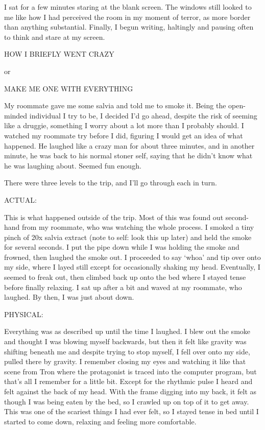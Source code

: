I sat for a few minutes staring at the blank screen.  The windows still looked to me like how I had perceived the room in my moment of terror, as more border than anything substantial.  Finally, I begun writing, haltingly and pausing often to think and stare at my screen.

\vspace{1em}\begin{sloppypar}{\ttfamily
HOW I BRIEFLY WENT CRAZY 

or 

MAKE ME ONE WITH EVERYTHING

My roommate gave me some salvia and told me to smoke it.  Being the open-minded individual I try to be, I decided I'd go ahead, despite the risk of seeming like a druggie, something I worry about a lot more than I probably should.  I watched my roommate try before I did, figuring I would get an idea of what happened.  He laughed like a crazy man for about three minutes, and in another minute, he was back to his normal stoner self, saying that he didn't know what he was laughing about.  Seemed fun enough.

There were three levels to the trip, and I'll go through each in turn.

ACTUAL:

This is what happened outside of the trip.  Most of this was found out second-hand from my roommate, who was watching the whole process.  I smoked a tiny pinch of 20x salvia extract (note to self: look this up later) and held the smoke for several seconds.  I put the pipe down while I was holding the smoke and frowned, then laughed the smoke out.  I proceeded to say `whoa' and tip over onto my side, where I layed still except for occasionally shaking my head.  Eventually, I seemed to freak out, then climbed back up onto the bed where I stayed tense before finally relaxing.  I sat up after a bit and waved at my roommate, who laughed.  By then, I was just about down.

PHYSICAL:

Everything was as described up until the time I laughed.  I blew out the smoke and thought I was blowing myself backwards, but then it felt like gravity was shifting beneath me and despite trying to stop myself, I fell over onto my side, pulled there by gravity.  I remember closing my eyes and watching it like that scene from Tron where the protagonist is traced into the computer program, but that's all I remember for a little bit.  Except for the rhythmic pulse I heard and felt against the back of my head.  With the frame digging into my back, it felt as though I was being eaten by the bed, so I crawled up on top of it to get away.  This was one of the scariest things I had ever felt, so I stayed tense in bed until I started to come down, relaxing and feeling more comfortable.

}
\end{sloppypar}

